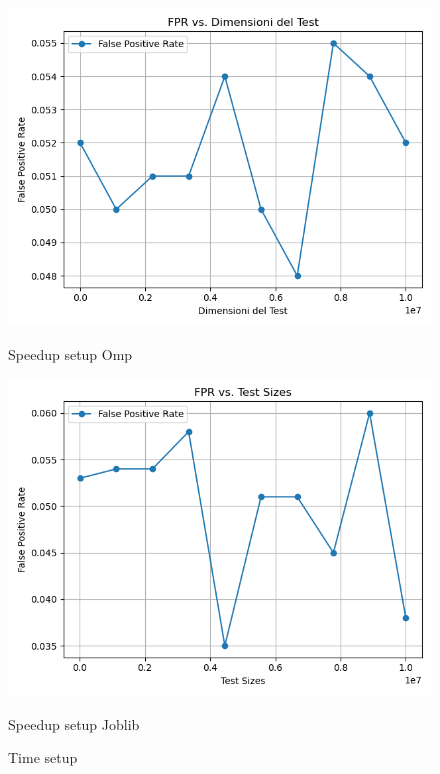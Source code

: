\documentclass[11pt]{article}
\begin{document}
    \begin{figure}[H]
        \centering
        \includegraphics[width=\linewidth]{omp/005/setup_fpr_plot}
            \caption{Speedup setup Omp}\label{fig:005-setup_fpr_omp}
        \endminipage\hfill
        \includegraphics[width=\linewidth]{joblib/005/setup_fpr_plot}
            \caption{Speedup setup Joblib}\label{fig:005-setup_fpr_joblib}
        \endminipage\hfill
        \caption{Time setup}
    \end{figure}
\end{document}
